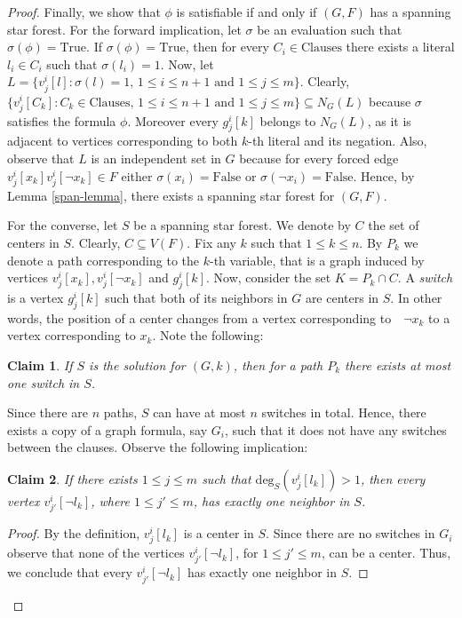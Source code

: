 \documentclass[en]{pracamgr}
\newtheorem{claim}{Claim}
\theoremstyle{definition}
\newcommand{\degree}[2]{\textrm{deg}_{#1}(#2)}
\newcommand{\true}{\textrm{True}}
\newcommand{\false}{\textrm{False}}
\begin{document}
\begin{proof}
	Finally, we show that $\phi$ is satisfiable if and only if $(G,F)$ has a spanning star forest. For the forward implication, let $\sigma$ be an evaluation such that $\sigma(\phi)=\true$. If $\sigma(\phi)=\textrm{True}$, then for every $C_i \in \textrm{Clauses}$ there exists a literal $l_i \in C_i$ such that $\sigma(l_i)=1$. Now, let $L = \{v^i_j[l]: \sigma(l)=1\text{, } 1 \leq i \leq n+1 \text{ and } 1 \leq j \leq m\}$. Clearly, $\{v^i_j[C_k]: C_k \in \textrm{Clauses} \text{, } 1 \leq i \leq n+1 \text{ and } 1 \leq j \leq m\} \subseteq N_G(L)$ because $\sigma$ satisfies the formula $\phi$. Moreover every $g^i_j[k]$ belongs to $N_G(L)$, as it is adjacent to vertices corresponding to both $k$-th literal and its negation. Also, observe that $L$ is an independent set in $G$ because for every forced edge $v^i_j[x_k]v^i_j[\neg x_k] \in F$ either $\sigma(x_i)=\false$ or $\sigma(\neg x_i)=\false$. Hence, by Lemma \ref{span-lemma}, there exists a spanning star forest for $(G,F)$.
	
	For the converse, let $S$ be a spanning star forest. We denote by $C$ the set of centers in $S$. Clearly, $C \subseteq V(F)$. Fix any $k$ such that $1 \leq k \leq n$. By $P_k$ we denote a path corresponding to the $k$-th variable, that is a graph induced by vertices $v^i_j[x_k],v^i_j[\neg x_k]$ and $g^i_j[k]$. Now, consider the set $K = P_k \cap C$. A \textit{switch} is a vertex $g^i_j[k]$ such that both of its neighbors in $G$ are centers in $S$. In other words, the position of a center changes from a vertex corresponding to~~$\neg x_k$ to a vertex corresponding to $x_k$. Note the following:
	
	\begin{claim}\label{switch}
		If $S$ is the solution for $(G,k)$, then for a path $P_k$ there exists at most one switch in $S$.
	\end{claim}

	Since there are $n$ paths, $S$ can have at most $n$ switches in total. Hence, there exists a copy of a graph formula, say $G_i$, such that it does not have any switches between the clauses. Observe the following implication:
	
	\begin{claim}
		If there exists $1 \leq j \leq m$ such that $\degree{S}{v^i_j[l_k]}>1$, then every vertex $v^i_{j'}[\neg l_k]$, where $1 \leq j' \leq m$, has exactly one neighbor in $S$.
	\end{claim}

	\begin{proof}
		By the definition, $v^i_j[l_k]$ is a center in $S$. Since there are no switches in $G_i$ observe that none of the vertices $v^i_{j'}[\neg l_k]$,  for $1 \leq j' \leq m$, can be a center. Thus, we conclude that every $v^i_{j'}[\neg l_k]$ has exactly one neighbor in $S$.
	\end{proof}


\end{proof}
\end{document}
